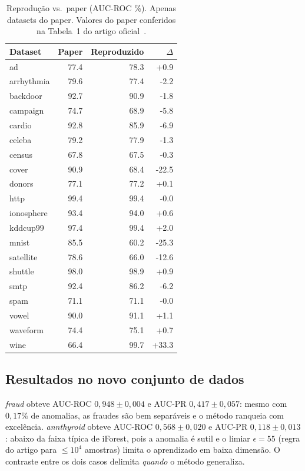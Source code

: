 \documentclass[conference]{IEEEtran}
\begin{document}
\begin{table}[t]
\centering
\caption{Reprodu\c{c}\~ao vs.\ paper (AUC-ROC \%). Apenas datasets do paper. Valores
do paper conferidos na Tabela~1 do artigo oficial~\cite{optiforest}.}
\label{tab:comp}
\footnotesize
\begin{tabular}{lrrr}
\toprule
Dataset & Paper & Reproduzido & $\Delta$ \\
\midrule
ad & 77.4 & 78.3 & +0.9 \\
arrhythmia & 79.6 & 77.4 & -2.2 \\
backdoor & 92.7 & 90.9 & -1.8 \\
campaign & 74.7 & 68.9 & -5.8 \\
cardio & 92.8 & 85.9 & -6.9 \\
celeba & 79.2 & 77.9 & -1.3 \\
census & 67.8 & 67.5 & -0.3 \\
cover & 90.9 & 68.4 & -22.5 \\
donors & 77.1 & 77.2 & +0.1 \\
http & 99.4 & 99.4 & -0.0 \\
ionosphere & 93.4 & 94.0 & +0.6 \\
kddcup99 & 97.4 & 99.4 & +2.0 \\
mnist & 85.5 & 60.2 & -25.3 \\
satellite & 78.6 & 66.0 & -12.6 \\
shuttle & 98.0 & 98.9 & +0.9 \\
smtp & 92.4 & 86.2 & -6.2 \\
spam & 71.1 & 71.1 & -0.0 \\
vowel & 90.0 & 91.1 & +1.1 \\
waveform & 74.4 & 75.1 & +0.7 \\
wine & 66.4 & 99.7 & +33.3 \\
\bottomrule
\end{tabular}
\end{table}

\subsection{Resultados no novo conjunto de dados}
\emph{fraud} obteve AUC-ROC $0{,}948 \pm 0{,}004$ e AUC-PR $0{,}417 \pm 0{,}057$:
mesmo com $0{,}17\%$ de anomalias, as fraudes s\~ao bem separ\'aveis e o m\'etodo
ranqueia com excel\^encia. \emph{annthyroid} obteve AUC-ROC $0{,}568 \pm 0{,}020$ e
AUC-PR $0{,}118 \pm 0{,}013$: abaixo da faixa t\'ipica de iForest, pois a anomalia \'e
sutil e o limiar $\epsilon = 55$ (regra do artigo para $\le 10^4$ amostras) limita o
aprendizado em baixa dimens\~ao. O contraste entre os dois casos delimita
\emph{quando} o m\'etodo generaliza.
\end{document}
